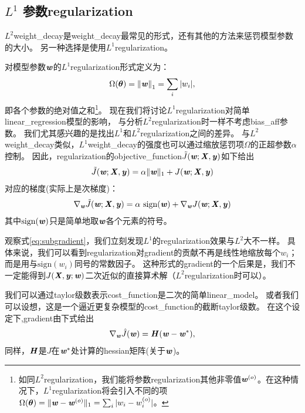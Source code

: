 \subsection{$L^1$ 参数\gls{regularization}}
\label{sec:l1_regularization}
$L^2$\gls{weight_decay}是\gls{weight_decay}最常见的形式，还有其他的方法来惩罚模型参数的大小。
另一种选择是使用$L^1$\gls{regularization}。

对模型参数$\boldsymbol{\mathit{w}}$的$L^1$\gls{regularization}形式定义为：
\begin{align}
 \Omega(\boldsymbol{\theta}) = \left\lVert \boldsymbol{\mathit{w}} \right\rVert_1 = \sum_i | w_i |,
 \end{align}
即各个参数的绝对值之和\footnote{如同$L^2$\gls{regularization}，我们能将参数\gls{regularization}其他非零值$\boldsymbol{\mathit{w}}^{(o)}$。在这种情况下，$L^1$\gls{regularization}将会引入不同的项$\Omega(\boldsymbol{\theta})=
\|\boldsymbol{\mathit{w}} - \boldsymbol{\mathit{w}}^{(o)} \|_1 = \sum_i | w_i - w_i^{(o)} |$。}。
现在我们将讨论$L^1$\gls{regularization}对简单\gls{linear_regression}模型的影响， 与分析$L^2$\gls{regularization}时一样不考虑\gls{bias_aff}参数。  
我们尤其感兴趣的是找出$L^1$和$L^2$\gls{regularization}之间的差异。
与$L^2$\gls{weight_decay}类似，$L^1$\gls{weight_decay}的强度也可以通过缩放惩罚项$\Omega$的正超参数$\alpha$控制。 
因此，\gls{regularization}的\gls{objective_function}$\tilde{J}(\boldsymbol{\mathit{w}};\boldsymbol{\mathit{X}}, \boldsymbol{\mathit{y}})$如下给出
\begin{align}
\tilde{J}(\boldsymbol{\mathit{w}};\boldsymbol{\mathit{X}}, \boldsymbol{\mathit{y}}) = \alpha \| \boldsymbol{\mathit{w}} \|_1 +  J(\boldsymbol{\mathit{w}};\boldsymbol{\mathit{X}}, \boldsymbol{\mathit{y}}) 
\end{align}
对应的梯度(实际上是次梯度)：
\begin{align}
\label{eq:subgradient}
  \nabla_{\boldsymbol{\mathit{w}}} \tilde{J}(\boldsymbol{\mathit{w}}; \boldsymbol{\mathit{X}}, \boldsymbol{\mathit{y}}) = \alpha~ \text{sign}(\boldsymbol{\mathit{w}}) + \nabla_{\boldsymbol{\mathit{w}}} J(\boldsymbol{\mathit{w}}; \boldsymbol{\mathit{X}}, \boldsymbol{\mathit{y}}) 
\end{align}
其中$\text{sign}(\boldsymbol{\mathit{w}})$只是简单地取$\boldsymbol{\mathit{w}}$各个元素的符号。


观察式\ref{eq:subgradient}，我们立刻发现$L^1$的\gls{regularization}效果与$L^2$大不一样。
具体来说，我们可以看到\gls{regularization}对\gls{gradient}的贡献不再是线性地缩放每个$w_i$；而是用与$\text{sign}(w_i)$同号的常数因子。
这种形式的\gls{gradient}的一个后果是，我们不一定能得到$J(\boldsymbol{\mathit{X}}, \boldsymbol{\mathit{y}};\boldsymbol{\mathit{w}})$二次近似的直接算术解（$L^2$\gls{regularization}时可以）。 
 
我们可以通过\gls{taylor}级数表示\gls{cost_function}是二次的简单\gls{linear_model}。
或者我们可以设想，这是一个逼近更复杂模型的\gls{cost_function}的截断\gls{taylor}级数。
在这个设定下,\gls{gradient}由下式给出
\begin{align}
  \nabla_{\boldsymbol{\mathit{w}}} \hat{J}(\boldsymbol{\mathit{w}}) = \boldsymbol{\mathit{H}} (\boldsymbol{\mathit{w}} - \boldsymbol{\mathit{w}}^*),
\end{align}
同样，$\boldsymbol{\mathit{H}}$是$J$在$\boldsymbol{\mathit{w}}^*$处计算的\gls{hessian}矩阵(关于$\boldsymbol{\mathit{w}}$)。

